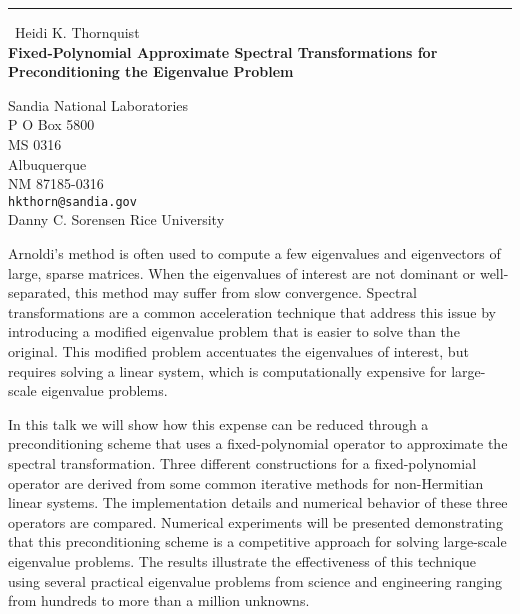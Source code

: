 \documentclass{report}
\begin{document}
\begin{center}
\rule{6in}{1pt} \
{\large Heidi K. Thornquist \\
{\bf Fixed-Polynomial Approximate Spectral Transformations for Preconditioning the Eigenvalue Problem}}

Sandia National Laboratories \\ P O Box 5800 \\ MS 0316 \\ Albuquerque \\ NM 87185-0316
\\
{\tt hkthorn@sandia.gov}\\
	Danny C. Sorensen
	Rice University\end{center}

Arnoldi's method is often used to compute a few eigenvalues and
eigenvectors of large, sparse matrices. When the eigenvalues of interest
are not dominant or well-separated, this method may suffer from slow
convergence. Spectral transformations are a common acceleration technique
that address this issue by introducing a modified eigenvalue problem that
is easier to solve than the original. This modified problem accentuates
the eigenvalues of interest, but requires solving a linear system, which
is
computationally expensive for large-scale eigenvalue problems.

In this talk we will show how this expense can be reduced through a
preconditioning scheme that uses a fixed-polynomial operator to
approximate the spectral transformation. Three different constructions
for a fixed-polynomial operator are derived from some
common iterative methods for non-Hermitian linear systems.
The implementation details and numerical behavior of these three
operators are compared. Numerical experiments will be presented
demonstrating that this preconditioning scheme is a competitive approach
for solving large-scale eigenvalue problems. The results
illustrate the effectiveness of this technique using several practical
eigenvalue problems from science and engineering ranging from hundreds to
more than a million unknowns.
\end{document}
